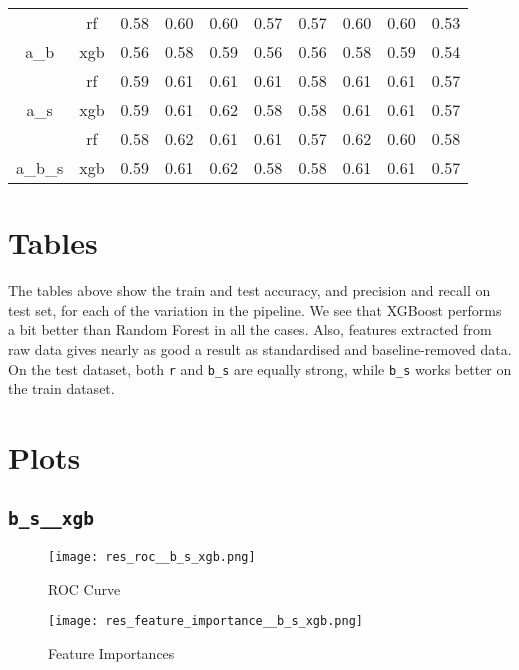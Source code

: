 \begin{table}[t]
\begin{tabular}{cc|c|c|c|c|c|c|c|c|}
\multicolumn{1}{|c|}{} &
  rf &
  0.58 &
  0.60 &
  0.60 &
  0.57 &
  0.57 &
  0.60 &
  0.60 &
  0.53 \\ \cline{2-10} 
\multicolumn{1}{|c|}{\multirow{-2}{*}{a\_b}} &
  xgb &
  0.56 &
  0.58 &
  0.59 &
  0.56 &
  0.56 &
  0.58 &
  0.59 &
  0.54 \\ \hline
\multicolumn{1}{|c|}{} &
  rf &
  0.59 &
  0.61 &
  0.61 &
  0.61 &
  0.58 &
  0.61 &
  0.61 &
  0.57 \\ \cline{2-10} 
\multicolumn{1}{|c|}{\multirow{-2}{*}{a\_s}} &
  xgb &
  0.59 &
  0.61 &
  0.62 &
  0.58 &
  0.58 &
  0.61 &
  0.61 &
  0.57 \\ \hline
\multicolumn{1}{|c|}{} &
  rf &
  0.58 &
  0.62 &
  0.61 &
  0.61 &
  0.57 &
  0.62 &
  0.60 &
  0.58 \\ \cline{2-10} 
\multicolumn{1}{|c|}{\multirow{-2}{*}{a\_b\_s}} &
  xgb &
  0.59 &
  0.61 &
  0.62 &
  0.58 &
  0.58 &
  0.61 &
  0.61 &
  0.57 \\ \hline
\end{tabular}
\end{table}

\section {Tables}

The tables above show the train and test accuracy, and precision and recall on test set, for each of the variation in the pipeline. We see that XGBoost performs a bit better than Random Forest in all the cases. Also, features extracted from raw data gives nearly as good a result as standardised and baseline-removed data. On the test dataset, both \texttt{r} and \texttt{b\_s} are equally strong, while \texttt{b\_s} works better on the train dataset. 

\section {Plots}
\subsection{\texttt{b\_s\_\_xgb}}
\begin{figure}[H]
\centering
\hspace*{-1.5cm}
\texttt{[image: res\_roc\_\_b\_s\_xgb.png]}
\caption{ROC Curve}
\label{fig-7-1}
\end{figure}

\begin{figure}[H]
\centering
\hspace*{-1.5cm}
\texttt{[image: res\_feature\_importance\_\_b\_s\_xgb.png]}
\caption{Feature Importances}
\label{fig-7-2}
\end{figure}


